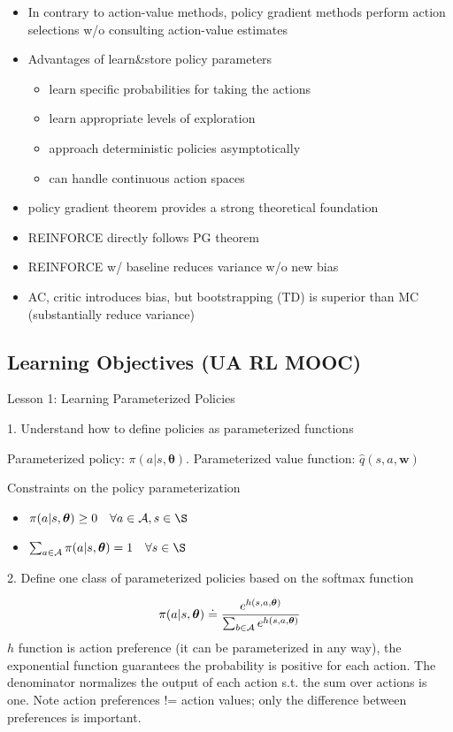 \documentclass[sutton_barto_notes.tex]{subfiles}
\begin{document}
\begin{itemize}
\item In contrary to action-value methods, policy gradient methods perform action selections w/o consulting action-value estimates
\item Advantages of learn\&store policy parameters
\begin{itemize}
\item learn specific probabilities for taking the actions
\item learn appropriate levels of exploration
\item approach deterministic policies asymptotically
\item can handle continuous action spaces
\end{itemize}
\item policy gradient theorem provides a strong theoretical foundation
\item REINFORCE directly follows PG theorem
\item REINFORCE w/ baseline reduces variance w/o new bias
\item AC, critic introduces bias, but bootstrapping (TD) is superior than MC (substantially reduce variance)
\end{itemize}

\subsection{Learning Objectives (UA RL MOOC)}

Lesson 1: Learning Parameterized Policies 

1. Understand how to define policies as parameterized functions 

Parameterized policy: $\pi(a|s,\bm{\theta})$. Parameterized value function: $\hat{q}(s,a,\bm{w})$

Constraints on the policy parameterization
\begin{itemize}
\item $\pi(a|s,\bm{\theta}) \geq 0 \quad \forall a \in \A, s \in \S$
\item $\sum_{a\in\A} \pi(a|s,\bm{\theta}) = 1 \quad \forall s \in \S$
\end{itemize}

2. Define one class of parameterized policies based on the softmax function 

$$\pi(a|s,\bm{\theta})\doteq \frac{e^{h(s,a,\bm{\theta})}}{\sum_{b\in\operatorname*{\mathcal{A}}}e^{h(s,a,\bm{\theta})}}$$
$h$ function is action preference (it can be parameterized in any way), the exponential function guarantees the probability is positive for each action. The denominator normalizes the output of each action s.t. the sum over actions is one.
Note action preferences != action values; only the difference between preferences is important.
\end{document}
